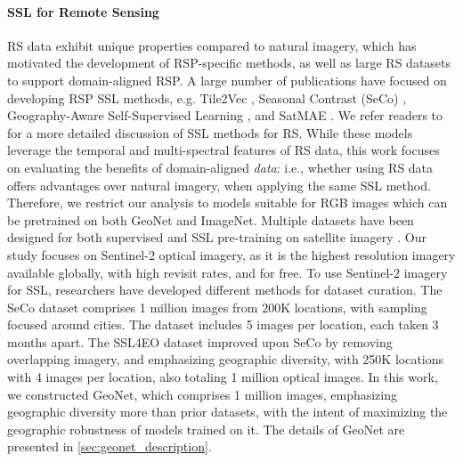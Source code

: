 \paragraph{SSL for Remote Sensing}
RS data exhibit unique properties compared to natural imagery, which has motivated the development of RSP-specific methods, as well as large RS datasets to support domain-aligned RSP. A large number of publications have focused on developing RSP SSL methods, e.g. Tile2Vec \cite{jean2019tile2vec}, Seasonal Contrast (SeCo) \cite{manas2021seasonal}, Geography-Aware Self-Supervised Learning \cite{ayush2021geography}, and SatMAE \cite{cong2022satmae}.  We refer readers to \cite{wang2022self, tao2023self} for a more detailed discussion of SSL methods for RS. While these models leverage the temporal and multi-spectral features of RS data, this work focuses on evaluating the benefits of domain-aligned \textit{data}: i.e., whether using RS data offers advantages over natural imagery, when applying the same SSL method. Therefore, we restrict our analysis to models suitable for RGB images which can be pretrained on both GeoNet and ImageNet.  Multiple datasets have been designed for both supervised \cite{cornebise2022open,christie2018functional,lam2018xview,demir2018deepglobe,gupta2019creating,helber2019eurosat,johnson2022opensentinelmap,tao2023tov,bastani2023satlaspretrain,xiong2024earthnets} and SSL pre-training on satellite imagery \cite{shen2023firerisk, li2021geographical}.  Our study focuses on Sentinel-2 optical imagery, as it is the highest resolution imagery available globally, with high revisit rates, and for free. To use Sentinel-2 imagery for SSL, researchers have developed different methods for dataset curation. The SeCo dataset \cite{manas2021seasonal} comprises 1 million images from 200K locations, with sampling focused around cities. The dataset includes 5 images per location, each taken 3 months apart. The SSL4EO dataset \cite{wang2023ssl4eo} improved upon SeCo by removing overlapping imagery, and emphasizing geographic diversity, with 250K locations with 4 images per location, also totaling 1 million optical images.  In this work, we constructed GeoNet, which comprises 1 million images, emphasizing geographic diversity more than prior datasets, with the intent of maximizing the geographic robustness of models trained on it. The details of GeoNet are presented in \cref{sec:geonet_description}.   


